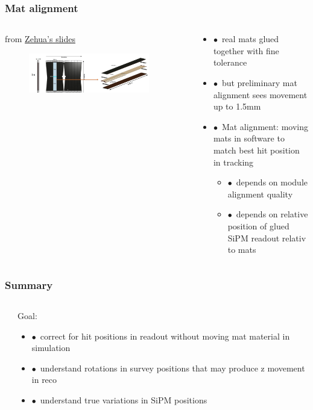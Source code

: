 \documentclass[aspectratio=1610, 12pt, xcolor=dvipsnames]{beamer}
\begin{document}
\begin{frame}\frametitle{Mat alignment}
  \begin{columns}
    \begin{column}[c]{0.48\textwidth}
      from \href{https://indico.cern.ch/event/1275394/contributions/5359493/attachments/2628409/4549668/SciFi_mat_alignment.pdf}{Zehua's slides}
      \begin{figure}
        \includegraphics[width=0.9\textwidth]{plots/scifi_mats.png}
      \end{figure}
    \end{column}
    \begin{column}[c]{0.48\textwidth}
      \begin{itemize}
        \item $\bullet$\, real mats glued together with fine tolerance
        \item $\bullet$\, but preliminary mat alignment sees movement up to 1.5mm
        \item $\bullet$\, Mat alignment: moving mats in software to match best hit position in tracking
        \begin{itemize}
          \item $\bullet$\, depends on module alignment quality
          \item $\bullet$\, depends on relative position of glued SiPM readout relativ to mats
        \end{itemize}
      \end{itemize}
    \end{column}
  \end{columns}
\end{frame}

\begin{frame}\frametitle{Summary}
  \begin{columns}
    \begin{column}[c]{0.48\textwidth}

    \end{column}
    \begin{column}[c]{0.48\textwidth}
      \to Goal:
      \begin{itemize}
        \item $\bullet$\, correct for hit positions in readout without moving mat material in simulation
        \item $\bullet$\, understand rotations in survey positions that may produce z movement in reco
        \item $\bullet$\, understand true variations in SiPM positions
      \end{itemize}
    \end{column}
  \end{columns}
\end{frame}
\end{document}
